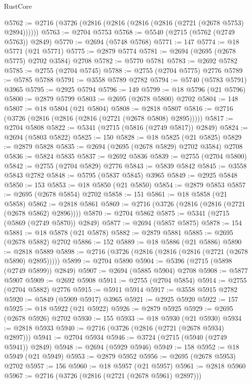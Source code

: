 \begin{lexlean}{RustCore}
\begin{coremodule}
@5762 := @2716 (@3726 (@2816 (@2816 (@2816 (@2816 (@2721 (@2678 @5753) @2894))))))
@5763 := @2704 @5753
@5768 := @5540 (@2715 (@5762 (@2749 @5763)) @2849)
@5770 := @2694 (@5748 @5768)
@5771 := 147
@5774 := @18 @5771 (@21 @5771)
@5775 := @2879 @5774
@5781 := @2694 (@2695 (@2678 @5775) @2702 @3584) @2708
@5782 := @5770 @5781
@5783 := @2692 @5782
@5785 := @2755 (@2704 @5745)
@5788 := @2755 (@2704 @5775) @2776
@5789 := @5785 @5788
@5791 := @3558 @5789 @2782
@5794 := @5740 (@5783 @5791) @3965
@5795 := @2925 @5794
@5796 := 149
@5799 := @18 @5796 (@21 @5796)
@5800 := @2879 @5799
@5803 := @2695 (@2678 @5800) @2702
@5804 := 148
@5807 := @18 @5804 (@21 @5804)
@5808 := @2818 @5807
@5816 := @2716 (@3726 (@2816 (@2816 (@2816 (@2721 (@2678 @5808) @2895)))))
@5817 := @2704 @5808
@5822 := @5341 (@2715 (@5816 (@2749 @5817)) @2849)
@5824 := @2694 (@5803 @5822)
@5825 := 150
@5828 := @18 @5825 (@21 @5825)
@5829 := @2879 @5828
@5835 := @2694 (@2695 (@2678 @5829) @2702 @3584) @2708
@5836 := @5824 @5835
@5837 := @2692 @5836
@5839 := @2755 (@2704 @5800)
@5842 := @2755 (@2704 @5829) @2776
@5843 := @5839 @5842
@5845 := @3558 @5843 @2782
@5848 := @5795 (@5837 @5845) @3965
@5849 := @2925 @5848
@5850 := 153
@5853 := @18 @5850 (@21 @5850)
@5854 := @2879 @5853
@5857 := @2695 (@2678 @5854) @2702
@5858 := 151
@5861 := @18 @5858 (@21 @5858)
@5862 := @2818 @5861
@5869 := @2716 (@3726 (@2816 (@2816 (@2721 (@2678 @5862) @2896))))
@5870 := @2704 @5862
@5875 := @5341 (@2715 (@5869 (@2749 @5870)) @2849)
@5877 := @2694 (@5857 @5875)
@5878 := 154
@5881 := @18 @5878 (@21 @5878)
@5882 := @2879 @5881
@5885 := @2695 (@2678 @5882) @2702
@5886 := 152
@5889 := @18 @5886 (@21 @5886)
@5890 := @2818 @5889
@5898 := @2716 (@3726 (@2816 (@2816 (@2816 (@2721 (@2678 @5890) @2895)))))
@5899 := @2704 @5890
@5904 := @5396 (@2715 (@5898 (@2749 @5899)) @2849)
@5907 := @2694 (@5885 @5904) @2708
@5908 := @5877 @5907
@5909 := @2692 @5908
@5911 := @2755 (@2704 @5854)
@5914 := @2755 (@2704 @5882) @2776
@5915 := @5911 @5914
@5917 := @3558 @5915 @2782
@5920 := @5849 (@5909 @5917) @3965
@5921 := @2925 @5920
@5922 := 157
@5925 := @18 @5922 (@21 @5922)
@5926 := @2879 @5925
@5929 := @2695 (@2678 @5926) @2702
@5930 := 155
@5933 := @18 @5930 (@21 @5930)
@5934 := @2818 @5933
@5940 := @2716 (@3726 (@2816 (@2721 (@2678 @5934) @2897)))
@5941 := @2704 @5934
@5946 := @3724 (@2715 (@5940 (@2749 @5941)) @2849)
@5948 := @2694 (@5929 @5946)
@5949 := 158
@5952 := @18 @5949 (@21 @5949)
@5953 := @2879 @5952
@5956 := @2695 (@2678 @5953) @2702
@5957 := 156
@5960 := @18 @5957 (@21 @5957)
@5961 := @2818 @5960
@5967 := @2716 (@3726 (@2816 (@2721 (@2678 @5961) @2897)))

\end{coremodule}
\end{lexlean}
